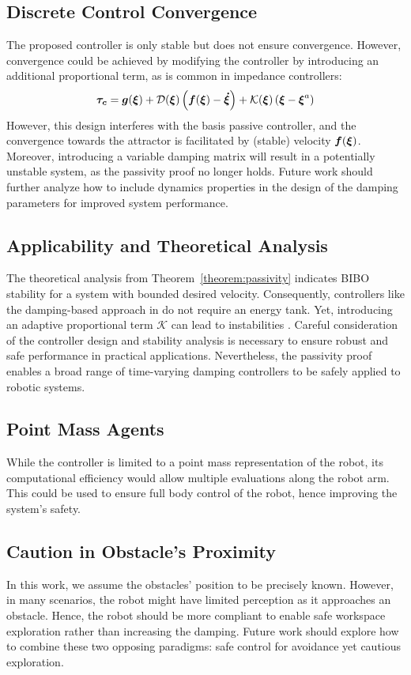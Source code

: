 \iflong
\subsection{Discrete Control Convergence}
The proposed controller is only stable but does not ensure convergence. However, convergence could be achieved by modifying the controller by introducing an additional proportional term, as is common in impedance controllers:
\begin{equation}
	\boldsymbol{\tau_c} = \boldsymbol{g} (\boldsymbol{\xi}) 
	+ \mathcal{D}(\boldsymbol{\xi}) \left(\boldsymbol{f}(\boldsymbol{\xi}) - \boldsymbol{\dot\xi} \right) 
	+ \mathcal{K}(\boldsymbol{\xi}) \left(\boldsymbol{\xi} - \boldsymbol{\xi}^a \right)
\label{eq:control_command_proportional}
\end{equation}
However, this design interferes with the basis passive controller, and the convergence towards the attractor is facilitated by (stable) velocity $\boldsymbol{f}(\boldsymbol{\xi})$. 
Moreover, introducing a variable damping matrix will result in a potentially unstable system, as the passivity proof no longer holds.
Future work should further analyze how to include dynamics properties in the design of the damping parameters for improved system performance.
\fi

\subsection{Applicability and Theoretical Analysis}
The theoretical analysis from Theorem~\ref{theorem:passivity} indicates BIBO stability for a system with bounded desired velocity. Consequently, controllers like the damping-based approach in \parencite{kronander2015passive} do not require an energy tank. Yet, introducing an adaptive proportional term $\mathcal{K}$ can lead to instabilities \parencite{ferraguti2013tank, kronander2016stability}. 
Careful consideration of the controller design and stability analysis is necessary to ensure robust and safe performance in practical applications. 
Nevertheless, the passivity proof enables a broad range of time-varying damping controllers to be safely applied to robotic systems.

\iflong
\subsection{Point Mass Agents}
While the controller is limited to a point mass representation of the robot, its computational efficiency would allow multiple evaluations along the robot arm. This could be used to ensure full body control of the robot, hence improving the system's safety.
\fi

\subsection{Caution in Obstacle's Proximity}
In this work, we assume the obstacles' position to be precisely known. However, in many scenarios, the robot might have limited perception as it approaches an obstacle. Hence, the robot should be more compliant to enable safe workspace exploration rather than increasing the damping. Future work should explore how to combine these two opposing paradigms: safe control for avoidance yet cautious exploration.

